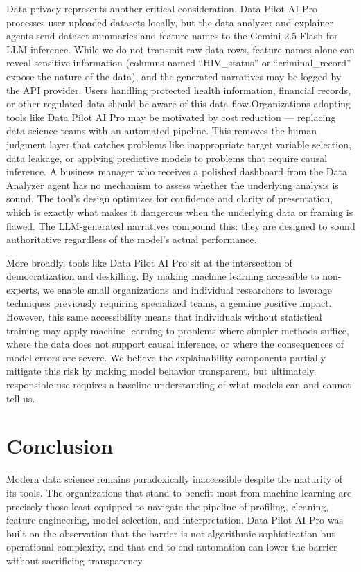 \documentclass{article}
\begin{document}
Data privacy represents another critical consideration. Data Pilot AI Pro processes user-uploaded datasets locally, but the data analyzer and explainer agents send dataset summaries and feature names to the Gemini 2.5 Flash for LLM inference. While we do not transmit raw data rows, feature names alone can reveal sensitive information (columns named ``HIV\_status'' or ``criminal\_record'' expose the nature of the data), and the generated narratives may be logged by the API provider. Users handling protected health information, financial records, or other regulated data should be aware of this data flow.Organizations adopting tools like Data Pilot AI Pro may be motivated by cost reduction — replacing data science teams with an automated pipeline. This removes the human judgment layer that catches problems like inappropriate target variable selection, data leakage, or applying predictive models to problems that require causal inference.
A business manager who receives a polished dashboard from the Data Analyzer agent has no mechanism to assess whether the underlying analysis is sound. The tool's design optimizes for confidence and clarity of presentation, which is exactly what makes it dangerous when the underlying data or framing is flawed.
The LLM-generated narratives compound this: they are designed to sound authoritative regardless of the model's actual performance. 

More broadly, tools like Data Pilot AI Pro sit at the intersection of democratization and deskilling. By making machine learning accessible to non-experts, we enable small organizations and individual researchers to leverage techniques previously requiring specialized teams, a genuine positive impact. However, this same accessibility means that individuals without statistical training may apply machine learning to problems where simpler methods suffice, where the data does not support causal inference, or where the consequences of model errors are severe. We believe the explainability components partially mitigate this risk by making model behavior transparent, but ultimately, responsible use requires a baseline understanding of what models can and cannot tell us. 



\section{Conclusion}



Modern data science remains paradoxically inaccessible despite the maturity of its tools. The organizations that stand to benefit most from machine learning are precisely those least equipped to navigate the pipeline of profiling, cleaning, feature engineering, model selection, and interpretation. Data Pilot AI Pro was built on the observation that the barrier is not algorithmic sophistication but operational complexity, and that end-to-end automation can lower the barrier without sacrificing transparency.
\end{document}
